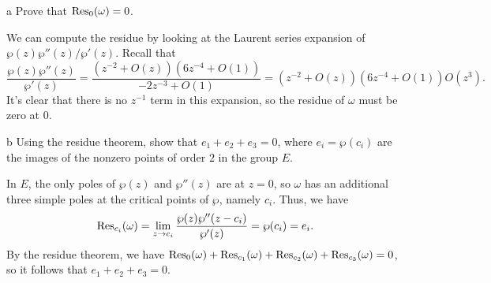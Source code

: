 \documentclass{pset}
\begin{document}
\begin{parts}
  \begin{part}{a}
    Prove that $\textrm{Res}_0(\omega)=0$.
  \end{part}

  We can compute the residue by looking at the Laurent series expansion of $\wp(z)\wp''(z)/\wp'(z)$. Recall that
  \[
    \frac{\wp(z)\wp''(z)}{\wp'(z)} = \frac{(z^{-2}+O(z))(6z^{-4}+O(1))}{-2z^{-3}+O(1)} =(z^{-2}+O(z))(6z^{-4}+O(1))O(z^3).
  \]
  It's clear that there is no $z^{-1}$ term in this expansion, so the residue of $\omega$ must be zero at $0$.
  
  \begin{part}{b}
    Using the residue theorem, show that $e_1+e_2+e_3=0$, where $e_i = \wp(c_i)$ are the images of the nonzero points of order $2$ in the group $E$.
  \end{part}

  In $E$, the only poles of $\wp(z)$ and $\wp''(z)$ are at $z=0$, so $\omega$ has an additional three simple poles at the critical points of $\wp$, namely $c_i$. Thus, we have
  \[
    \textrm{Res}_{c_i}(\omega)=\lim_{z\to c_i} \frac{\wp(z)\wp''(z-c_i)}{\wp'(z)} = \wp(c_i)=e_i.
  \]
  By the residue theorem, we have $\textrm{Res}_0(\omega)+\textrm{Res}_{c_1}(\omega)+\textrm{Res}_{c_2}(\omega)+\textrm{Res}_{c_3}(\omega)=0$, so it follows that $e_1+e_2+e_3=0$.
\end{parts}
\end{document}
